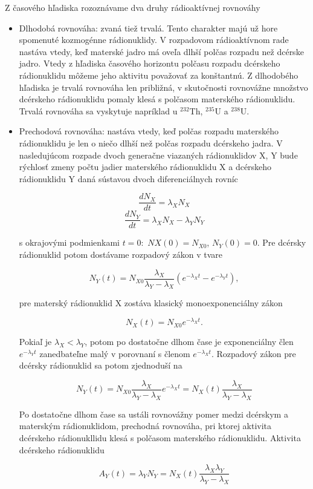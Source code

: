 \documentclass[../../main.tex]{subfiles}
\begin{document}
Z časového hľadiska rozoznávame dva druhy rádioaktívnej rovnováhy
\begin{itemize}
\item Dlhodobá rovnováha: zvaná tiež trvalá. Tento charakter majú už hore spomenuté kozmogénne rádionuklidy. V rozpadovom rádioaktívnom rade nastáva vtedy, keď materské jadro má oveľa dlhší polčas rozpadu než dcérske jadro. Vtedy z hľadiska časového horizontu polčasu rozpadu dcérskeho rádionuklidu môžeme jeho aktivitu považovať za konštantnú. Z dlhodobého hľadiska je trvalá rovnováha len približná, v skutočnosti rovnovážne množstvo dcérskeho rádionuklidu pomaly klesá s polčasom materského rádionuklidu. Trvalá rovnováha sa vyskytuje napríklad u $^{232}$Th, $^{235}$U a $^{238}$U.
\item Prechodová rovnováha: nastáva vtedy, keď polčas rozpadu materského rádionuklidu je len o niečo dlhší než polčas rozpadu dcérskeho jadra. V nasledujúcom rozpade dvoch generačne viazaných rádionuklidov X, Y bude rýchlosť zmeny počtu jadier materského rádionuklidu X a dcérskeho rádionuklidu Y daná sústavou dvoch diferenciálnych rovníc

$$ \frac{dN_X}{dt} = \lambda_XN_X $$
$$ \frac{dN_Y}{dt} = \lambda_XN_X - \lambda_YN_Y $$

s okrajovými podmienkami $t=0:$ $NX(0)=N_{X0}$, $N_Y(0)=0$. Pre dcérsky rádionuklid potom dostávame rozpadový zákon v tvare

$$ N_Y(t) = N_{X0}\frac{\lambda_X}{\lambda_Y - \lambda_X} (e^{-\lambda_Xt}-e^{-\lambda_Yt}),$$

pre materský rádionuklid X zostáva klasický monoexponenciálny zákon

$$ N_X(t) = N_{X0}e^{-\lambda_Xt}.$$

Pokiaľ je $\lambda_X<\lambda_Y$, potom po dostatočne dlhom čase je exponenciálny člen $e^{-\lambda_Yt}$ zanedbateľne malý v porovnaní s členom $e^{-\lambda_Xt}$. Rozpadový zákon pre dcérsky rádionuklid sa potom zjednoduší na 

$$ N_Y(t) = N_{X0}\frac{\lambda_X}{\lambda_Y - \lambda_X}e^{-\lambda_Xt} = N_X(t)\frac{\lambda_X}{\lambda_Y - \lambda_X} $$

Po dostatočne dlhom čase sa ustáli rovnovážny pomer medzi dcérskym a materským rádionuklidom, prechodná rovnováha, pri ktorej aktivita dcérskeho rádionukllidu klesá s polčasom materského rádionuklidu. Aktivita dcérskeho rádionuklidu 

$$ A_Y(t) = \lambda_YN_Y = N_X(t)\frac{\lambda_X\lambda_Y}{\lambda_Y-\lambda_X} $$


\end{itemize}
\end{document}
